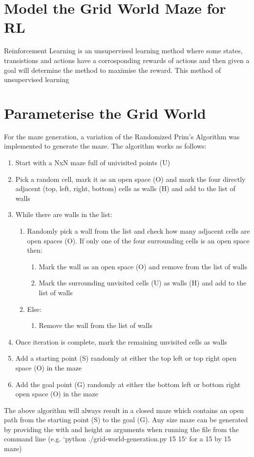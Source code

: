 \documentclass[twoside, 12pt, a4paper]{article}
\begin{document}
\section{Model the Grid World Maze for RL} \label{ModelRL}
Reinforcement Learning is an unsupervised learning method where some states, transistions and actions have a corrosponding rewards of actions and then given a goal will determine the method to maximise the reward. This method of unsupervised learning

\section{Parameterise the Grid World}
For the maze generation, a variation of the Randomized Prim’s Algorithm was implemented to generate the maze. The algorithm works as follows:
\begin{enumerate}
\item Start with a NxN maze full of univisited points (U)
\item Pick a random cell, mark it as an open space (O) and mark the four directly adjacent (top, left, right, bottom) cells as walls (H) and add to the list of walls
\item While there are walls in the list:
\begin{enumerate}
\item Randomly pick a wall from the list and check how many adjacent cells are open spaces (O). If only one of the four surrounding cells is an open space then:
\begin{enumerate}
\item Mark the wall as an open space (O) and remove from the list of walls
\item Mark the surrounding unvisited cells (U) as walls (H) and add to the list of walls
\end{enumerate}
\item Else:
\begin{enumerate}
\item Remove the wall from the list of walls
\end{enumerate}
\end{enumerate}
\item Once iteration is complete, mark the remaining unvisited cells as walls
\item Add a starting point (S) randomly at either the top left or top right open space (O) in the maze
\item Add the goal point (G) randomly at either the bottom left or bottom right open space (O) in the maze
\end{enumerate}
The above algorithm will always result in a closed maze which contains an open path from the starting point (S) to the goal (G). Any size maze can be generated by providing the with and height as arguments when running the file from the command line (e.g. `python ./grid-world-generation.py 15 15` for a 15 by 15 maze)
\end{document}
